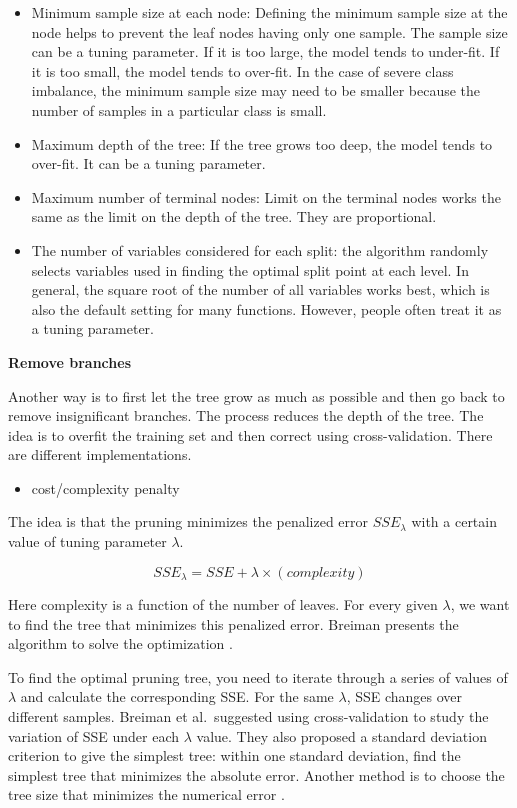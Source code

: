 \documentclass[
  12pt,
]{krantz}
\providecommand{\tightlist}{%
  \setlength{\itemsep}{0pt}\setlength{\parskip}{0pt}}
\begin{document}
\begin{itemize}
\item
  Minimum sample size at each node: Defining the minimum sample size at the node helps to prevent the leaf nodes having only one sample. The sample size can be a tuning parameter. If it is too large, the model tends to under-fit. If it is too small, the model tends to over-fit. In the case of severe class imbalance, the minimum sample size may need to be smaller because the number of samples in a particular class is small.
\item
  Maximum depth of the tree: If the tree grows too deep, the model tends to over-fit. It can be a tuning parameter.
\item
  Maximum number of terminal nodes: Limit on the terminal nodes works the same as the limit on the depth of the tree. They are proportional.
\item
  The number of variables considered for each split: the algorithm randomly selects variables used in finding the optimal split point at each level. In general, the square root of the number of all variables works best, which is also the default setting for many functions. However, people often treat it as a tuning parameter.
\end{itemize}

\textbf{Remove branches}

Another way is to first let the tree grow as much as possible and then go back to remove insignificant branches. The process reduces the depth of the tree. The idea is to overfit the training set and then correct using cross-validation. There are different implementations.

\begin{itemize}
\tightlist
\item
  cost/complexity penalty
\end{itemize}

The idea is that the pruning minimizes the penalized error \(SSE_{\lambda}\) with a certain value of tuning parameter \(\lambda\).

\[SSE_{\lambda} = SSE+\lambda \times (complexity)\]

Here complexity is a function of the number of leaves. For every given \(\lambda\), we want to find the tree that minimizes this penalized error. Breiman presents the algorithm to solve the optimization \citep{Breiman1984}.

To find the optimal pruning tree, you need to iterate through a series of values of \(\lambda\) and calculate the corresponding SSE. For the same \(\lambda\), SSE changes over different samples. Breiman et al.~suggested using cross-validation \citep{Breiman1984} to study the variation of SSE under each \(\lambda\) value. They also proposed a standard deviation criterion to give the simplest tree: within one standard deviation, find the simplest tree that minimizes the absolute error. Another method is to choose the tree size that minimizes the numerical error \citep{Hastie2008}.
\end{document}
